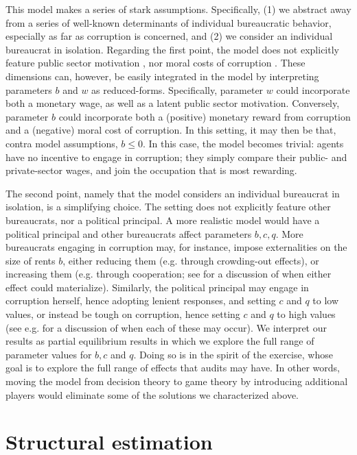 {This model makes a series of stark assumptions. Specifically, (1) we abstract away from a series of well-known determinants of individual bureaucratic behavior, especially as far as corruption is concerned, and (2) we consider an individual bureaucrat in isolation. Regarding the first point, the model does not explicitly feature public sector motivation \citep{dal2013strengthening}, nor moral costs of corruption \citep[see e.g.][]{roseackerman1975}. These dimensions can, however, be easily integrated in the model by interpreting parameters $b$ and $w$ as reduced-forms. Specifically, parameter $w$ could incorporate both a monetary wage, as well as a latent public sector motivation. Conversely, parameter $b$ could incorporate both a (positive) monetary reward from corruption and a (negative) moral cost of corruption. In this setting, it may then be that, contra model assumptions, $b \leq 0$. In this case, the model becomes trivial: agents have no incentive to engage in corruption; they simply compare their public- and private-sector wages, and join the occupation that is most rewarding. 

The second point, namely that the model considers an individual bureaucrat in isolation, is a simplifying choice. The setting does not explicitly feature other bureaucrats, nor a political principal. A more realistic model would have a political principal and other bureaucrats affect parameters $b, c, q$. More bureaucrats engaging in corruption may, for instance, impose externalities on the size of rents $b$, either reducing them (e.g. through crowding-out effects), or increasing them (e.g. through cooperation; see \citet{shleifervishny1993corruption} for a discussion of when either effect could materialize). Similarly, the political principal may engage in corruption herself, hence adopting lenient responses, and setting $c$ and $q$ to low values, or instead be tough on corruption, hence setting $c$ and $q$ to high values (see e.g. \citet{ferraz_electoral_2011} for a discussion of when each of these may occur). We interpret our results as partial equilibrium results in which we explore the full range of parameter values for $b,c$ and $q$. Doing so is in the spirit of the exercise, whose goal is to explore the full range of effects that audits may have. In other words, moving the model from decision theory to game theory by introducing additional players would eliminate some of the solutions we characterized above. 

\section{Structural estimation}
\label{sec:structural}

}
